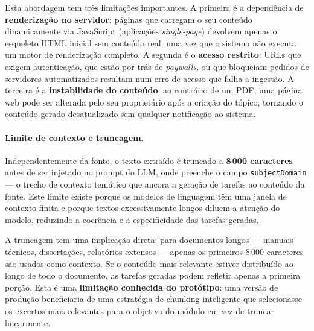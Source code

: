 Esta abordagem tem tr\^es limita\c{c}\~oes importantes. A primeira \'e a
depend\^encia de \textbf{renderiza\c{c}\~ao no servidor}: p\'aginas que
carregam o seu conte\'udo dinamicamente via JavaScript (aplica\c{c}\~oes
\emph{single-page}) devolvem apenas o esqueleto HTML inicial sem conte\'udo
real, uma vez que o sistema n\~ao executa um motor de renderiza\c{c}\~ao
completo. A segunda \'e o \textbf{acesso restrito}: URLs que exigem
autentica\c{c}\~ao, que est\~ao por tr\'as de \emph{paywalls}, ou que
bloqueiam pedidos de servidores automatizados resultam num erro de acesso
que falha a ingest\~ao. A terceira \'e a \textbf{instabilidade do conte\'udo}:
ao contr\'ario de um PDF, uma p\'agina web pode ser alterada pelo seu
propriet\'ario ap\'os a cria\c{c}\~ao do t\'opico, tornando o conte\'udo
gerado desatualizado sem qualquer notifica\c{c}\~ao ao sistema.

\paragraph{Limite de contexto e truncagem.}
Independentemente da fonte, o texto extra\'ido \'e truncado a
\textbf{8\,000 caracteres} antes de ser injetado no prompt do LLM, onde
preenche o campo \texttt{subjectDomain} --- o trecho de contexto tem\'atico
que ancora a gera\c{c}\~ao de tarefas ao conte\'udo da fonte. Este limite
existe porque os modelos de
linguagem t\^em uma janela de contexto finita e porque textos
excessivamente longos diluem a aten\c{c}\~ao do modelo, reduzindo a
coer\^encia e a especificidade das tarefas geradas.

A truncagem tem uma implica\c{c}\~ao direta: para documentos longos ---
manuais t\'ecnicos, disserta\c{c}\~oes, relat\'orios extensos --- apenas
os primeiros 8\,000 caracteres s\~ao usados como contexto. Se o conte\'udo
mais relevante estiver distribu\'ido ao longo de todo o documento, as
tarefas geradas podem refletir apenas a primeira por\c{c}\~ao. Esta \'e
uma \textbf{limita\c{c}\~ao conhecida do prot\'otipo}: uma vers\~ao de
produ\c{c}\~ao beneficiaria de uma estratégia de chunking inteligente que
selecionasse os excertos mais relevantes para o objetivo do m\'odulo
em vez de truncar linearmente.


